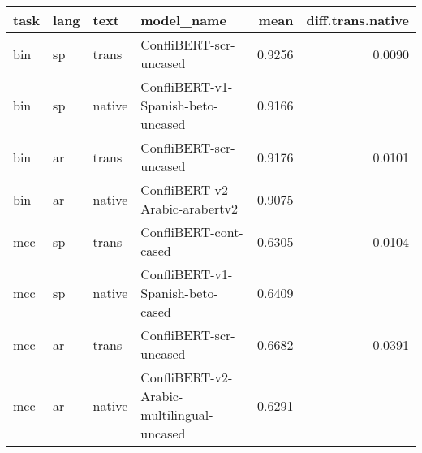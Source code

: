 \begin{table}[ht]
\centering
\begin{tabular}{llllrr}
  \hline
task & lang & text & model\_name & mean & diff.trans.native \\ 
  \hline
bin & sp & trans & ConfliBERT-scr-uncased & 0.9256 & 0.0090 \\ 
bin & sp & native & ConfliBERT-v1-Spanish-beto-uncased & 0.9166 &   \\ 
bin & ar & trans & ConfliBERT-scr-uncased & 0.9176 & 0.0101 \\ 
bin & ar & native & ConfliBERT-v2-Arabic-arabertv2 & 0.9075 &   \\ 
mcc & sp & trans & ConfliBERT-cont-cased & 0.6305 & -0.0104 \\ 
mcc & sp & native & ConfliBERT-v1-Spanish-beto-cased & 0.6409 &   \\ 
mcc & ar & trans & ConfliBERT-scr-uncased & 0.6682 & 0.0391 \\ 
mcc & ar & native & ConfliBERT-v2-Arabic-multilingual-uncased & 0.6291 &   \\ 
\hline
\end{tabular}
\end{table}
